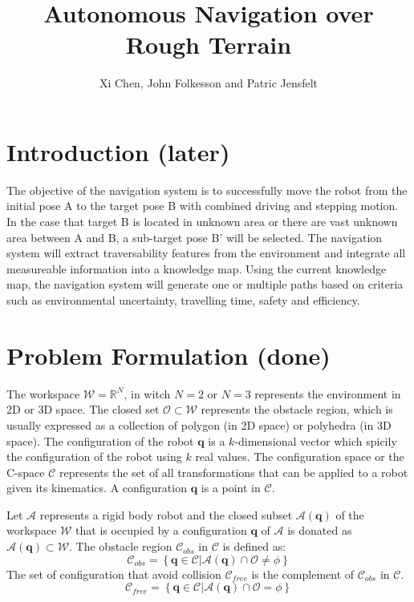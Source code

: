 \documentclass[letterpaper, 12 pt, conference]{ieeeconf}  %
\title{\LARGE \bf
Autonomous Navigation over Rough Terrain
}
\author{Xi Chen, John Folkesson and Patric Jensfelt %
}
\begin{document}
\maketitle
\thispagestyle{empty}
\pagestyle{empty}

\begin{abstract}
\blindtext

\end{abstract}


\section{Introduction (later)}
The objective of the navigation system is to successfully move the robot from the initial pose A to the target pose B with combined driving and stepping motion. In the case that target B is located in unknown area or there are vast unknown area between A and B, a sub-target pose B' will be selected.
The navigation system will extract traversability features from the environment and integrate all measureable information into a knowledge map. Using the current knowledge map, the navigation system will generate one or multiple paths  based on criteria such as environmental uncertainty, travelling time, safety and efficiency.

\section{Problem Formulation (done)}
The workspace $\mathcal{W} = \mathbb{R}^{N}$, in witch $N=2$ or $N=3$ represents the environment in 2D or 3D space. The closed set $\mathcal{O}\subset \mathcal{W}$ represents the obstacle region, which is usually expressed as a collection of polygon (in 2D space) or polyhedra (in 3D space). 
The configuration of the robot $\textbf{q}$ is a $k$-dimensional vector which spicily the configuration of the robot using $k$ real values.  
The configuration space or the C-space $\mathcal{C}$ represents the set of all transformations that can be applied to a robot given its kinematics. A configuration $\textbf{q}$ is a point in $\mathcal{C}$.

Let $\mathcal{A}$ represents a rigid body robot and the closed subset $\mathcal{A}(\textbf{q})$ of the workspace $\mathcal{W}$ that is occupied by a configuration $\textbf{q}$ of $\mathcal{A}$ is donated as $\mathcal{A}(\textbf{q})\subset \mathcal{W}$.
The obstacle region $\mathcal{C}_{obs}$ in $\mathcal{C}$ is defined as:
\[
\mathcal{C}_{obs} = \left \{\textbf{q} \in \mathcal{C} |\mathcal{A}(\textbf{q})\cap \mathcal{O} \neq \phi \right \}
\]
The set of configuration that avoid collision $\mathcal{C}_{free}$ is the complement of $\mathcal{C}_{obs}$ in $\mathcal{C}$.
\[
\mathcal{C}_{free} = \left \{\textbf{q} \in \mathcal{C} |\mathcal{A}(\textbf{q})\cap \mathcal{O} = \phi \right \}
\]
\end{document}
